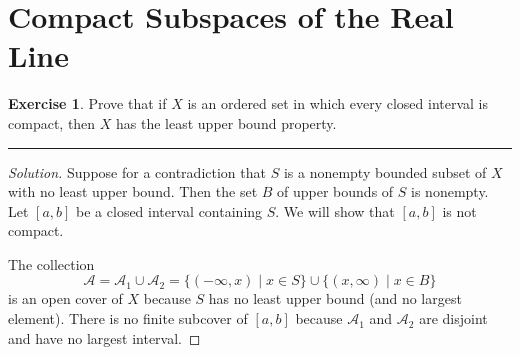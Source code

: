 \documentclass{article}
\theoremstyle{definition}
\newtheorem{exercise}{Exercise}[section]
\begin{document}
\addtocounter{section}{26}
\section{Compact Subspaces of the Real Line}

\begin{exercise}
  Prove that if $X$ is an ordered set in which every closed interval is compact, then $X$ has the least upper bound property.
\end{exercise}
\hrule
\begin{proof}[Solution]
  Suppose for a contradiction that $S$ is a nonempty bounded subset of $X$ with no least upper bound. Then the set $B$ of upper bounds of $S$ is nonempty. Let $[a,b]$ be a closed interval containing $S$. We will show that $[a,b]$ is not compact.

  The collection
  $$\mathcal{A} = \mathcal{A}_1\cup\mathcal{A}_2 = \{(-\infty, x)\mid x\in S\}\cup \{(x,\infty)\mid x\in B\}$$
  is an open cover of $X$ because $S$ has no least upper bound (and no largest element). There is no finite subcover of $[a,b]$ because $\mathcal{A}_1$ and $\mathcal{A}_2$ are disjoint and have no largest interval.
\end{proof}

\pagebreak
\end{document}
